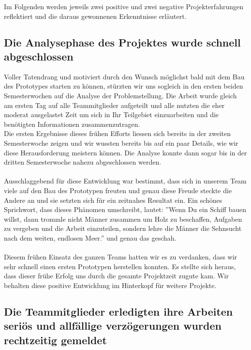 Im  Folgenden werden jeweils zwei positive und zwei negative Projekterfahrungen reflektiert und die daraus gewonnenen Erkenntnisse erläutert.

\subsection{Die Analysephase des Projektes wurde schnell abgeschlossen}

Voller Tatendrang und motiviert durch den Wunsch möglichst bald mit dem Bau des Prototypes starten zu können, stürzten wir uns sogleich in den ersten beiden Semesterwochen auf die Analyse der Problemstellung. Die Arbeit wurde gleich am ersten Tag auf alle Teammitglieder aufgeteilt und alle nutzten die eher moderat ausgelastet Zeit um sich in Ihr Teilgebiet einzuarbeiten und die benötigten Informationen zusammenzutragen.\\
Die ersten Ergebnisse dieses frühen Efforts liessen sich bereits in der zweiten Semesterwoche zeigen und wir wussten bereits bis auf ein paar Details, wie wir diese Herausforderung meistern können. Die Analyse konnte dann sogar bis in der dritten Semesterwoche nahezu abgeschlossen werden.\\
\\
Ausschlaggebend für diese Entwicklung war bestimmt, dass sich in unserem Team viele auf den Bau des Prototypen freuten und genau diese Freude steckte die Andere an und sie setzten sich für ein zeitnahes Resultat ein. Ein schönes Sprichwort, dass dieses Phänomen umschreibt, lautet:  ''Wenn Du ein Schiff bauen willst, dann trommle nicht Männer zusammen um Holz zu beschaffen, Aufgaben zu vergeben und die Arbeit einzuteilen, sondern lehre die Männer die Sehnsucht nach dem weiten, endlosen Meer.'' \cite{SCHIFF} und genau das geschah.\\
\\
Diesem frühen Einsatz des ganzen Teams hatten wir es zu verdanken, dass wir sehr schnell einen ersten Prototypen herstellen konnten. Es stellte sich heraus, dass dieser frühe Erfolg uns durch die gesamte Projektzeit zugute kam. Wir behalten diese positive Entwicklung im Hinterkopf für weitere Projekte.

\subsection{Die Teammitglieder erledigten ihre Arbeiten seriös und allfällige verzögerungen wurden rechtzeitig gemeldet}

